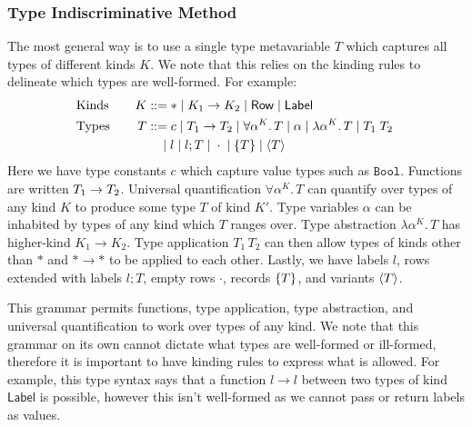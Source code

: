 \documentclass[acmsmall, 9pt]{article}
\begin{document}
\subsubsection{Type Indiscriminative Method}
\label{sssec:tau-method}
The most general way is to use a single type metavariable $T$ which captures all types of different kinds $K$. We note that this relies on the kinding rules to delineate which types are well-formed. For example:
\begin{align*}
  &\text{Kinds} \quad &K &::= * \; | \; K_1 \rightarrow K_2 \; | \; \mathsf{Row} \; | \; \mathsf{Label} \span\span \\
  &\text{Types} \quad &T &::= c \; | \; \tyFun{T_1}{T_2} \; | \; \forall \alpha^K . \, T\; | \; \alpha \; | \; \lambda \alpha^K. \, T \;| \; T_1 \; T_2 \;    \span\span\\
  &&&\quad \; | \; l \; | \; l ; T \; | \; \cdot \; | \;\tyBrace{T} \; | \; \tyAngle{T} \\
\end{align*}
Here we have type constants $c$ which capture value types such as $\texttt{Bool}$. Functions are written ${T_1}\rightarrow{T_2}$. Universal quantification $\forall \alpha^K. \, T$ can quantify over types of any kind $K$ to produce some type $T$ of kind $K'$. Type variables $\alpha$ can be inhabited by types of any kind which $T$ ranges over. Type abstraction $\lambda \alpha^K. \, T$ has higher-kind $K_1 \rightarrow K_2$. Type application $T_1 \, T_2$ can then allow types of kinds other than $*$ and $* \rightarrow *$ to be applied to each other. Lastly, we have labels $l$, rows extended with labels $l; T$, empty rows $\cdot$, records $\{ T \}$, and variants $\langle T \rangle$.

This grammar permits functions, type application, type abstraction, and universal quantification to work over types of any kind. We note that this grammar on its own cannot dictate what types are well-formed or ill-formed, therefore it is important to have kinding rules to express what is allowed. For example, this type syntax says that a function $l \rightarrow l$ between two types of kind $\mathsf{Label}$ is possible, however this isn't well-formed as we cannot pass or return labels as values.
\end{document}
